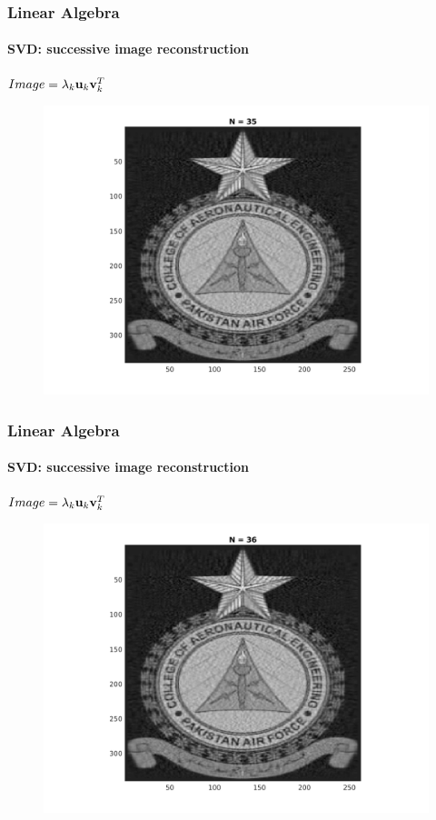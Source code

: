 \documentclass[hyperref={pdfpagelabels=true}]{beamer}
\begin{document}
\begin{frame}
\frametitle{Linear Algebra}
\framesubtitle{SVD: successive image reconstruction} 
\small{
\begin{center}
$Image = \lambda_k{\bf u}_k {\bf v}_k^T$
\end{center}}
\begin{figure}[!htb]
\centering
\includegraphics [scale=0.48]{n/b35.png}
\end{figure}
\end{frame}

\begin{frame}
\frametitle{Linear Algebra}
\framesubtitle{SVD: successive image reconstruction} 
\small{
\begin{center}
$Image = \lambda_k{\bf u}_k {\bf v}_k^T$
\end{center}}
\begin{figure}[!htb]
\centering
\includegraphics [scale=0.48]{n/b36.png}
\end{figure}
\end{frame}
\end{document}

